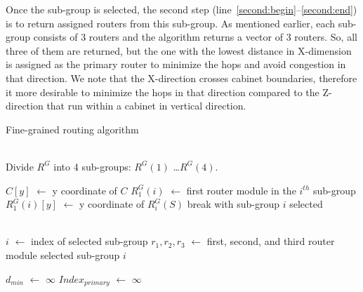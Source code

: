 Once the sub-group is selected, the second step (line~\ref{second:begin}--\ref{second:end}) is to return assigned routers from this sub-group.
As mentioned earlier, each sub-group consists of 3 routers and the algorithm returns a vector of 3 routers. So, all three of them are 
returned, but the one with the lowest distance in X-dimension is assigned as the primary router to minimize the hops and avoid congestion 
in that direction. We note that the X-direction crosses cabinet boundaries, therefore it more desirable to minimize the hops in that 
direction compared to the Z-direction that run within a cabinet in vertical direction.


\begin{algorithm}
\caption{Fine-grained routing algorithm}
\label{alg:fgr}
\begin{algorithmic}[1]
 \\ 
\State Divide $R^G$ into 4 sub-groups: $R^G(1)$ \ldots $R^G(4)$.

 
\label{first:begin}
    \State $C[y]$ $\leftarrow$ y coordinate of $C$
    \State $R^G_{1}(i)$ $\leftarrow$ first router module in the $i^{th}$ sub-group
    \State $R^G_{1}(i)[y]$ $\leftarrow$ y coordinate of $R^G_{i}(S)$
    \State break with sub-group $i$ selected
    \EndIf
\EndFor
\label{first:end}

\\ 

\State $i$ $\leftarrow$ index of selected sub-group
\label{second:begin}
\State $r_1, r_2, r_3$ $\leftarrow$ first, second, and third router module 
\State \hspace{\algorithmicindent} selected sub-group $i$

\State $d_{min}$ $\leftarrow$ $\infty$ 
\State $Index_{primary}$ $\leftarrow$ $\infty$


\end{algorithmic}
\end{algorithm}
